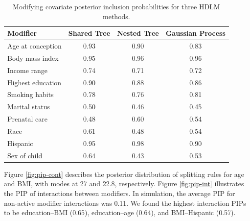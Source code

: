 \documentclass[12pt]{article}
\begin{document}
\begin{table}[!ht]
\footnotesize
    \centering
    \caption{Modifying covariate posterior inclusion probabilities for three HDLM methods.}
    \label{tab:data_mod}
    \begin{tabular}{lccc}
        \toprule[2pt]
        Modifier & Shared Tree & Nested Tree & Gaussian Process\\
        \hline
        Age at conception &  0.93 & 0.90 & 0.83\\
        Body mass index & 0.95 & 0.96 & 0.96\\
        Income range &  0.74 & 0.71 & 0.72\\
        Highest education & 0.90 & 0.88 & 0.86\\
        Smoking habits &  0.78 & 0.76 & 0.81\\
        Marital status &  0.50 & 0.46 & 0.45\\
        Prenatal care &  0.48 & 0.60 & 0.54\\
        Race & 0.61 & 0.48 & 0.54\\
        Hispanic & 0.95 & 0.98 & 0.90\\
        Sex of child & 0.64 & 0.43 & 0.53\\
        \bottomrule
    \end{tabular}
\end{table}


Figure \ref{fig:pip-cont} describes the posterior distribution of splitting rules for age and BMI, with modes at 27 and 22.8, respectively. Figure \ref{fig:pip-int} illustrates the PIP of interactions between modifiers. In simulation, the average PIP for non-active modifier interactions was 0.11. We found the highest interaction PIPs to be education--BMI (0.65), education--age (0.64), and BMI--Hispanic (0.57).
\end{document}
